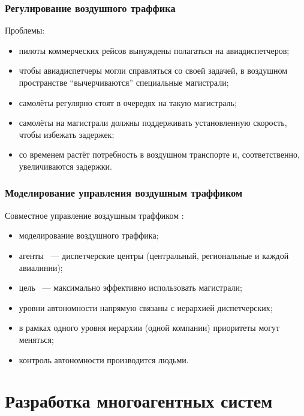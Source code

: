\documentclass{beamer}
\begin{document}
\begin{frame}
  \frametitle{Регулирование воздушного траффика}
  Проблемы:
  \begin{itemize}
    \item пилоты коммерческих рейсов вынуждены полагаться на авиадиспетчеров;
    \item чтобы авиадиспетчеры могли справляться со своей задачей, в воздушном
      пространстве ``вычерчиваются'' специальные магистрали;
    \item самолёты регулярно стоят в очередях на такую магистраль;
    \item самолёты на магистрали должны поддерживать установленную скорость,
      чтобы избежать задержек;
    \item со временем растёт потребность в воздушном транспорте и, соответственно,
      увеличиваются задержки.
  \end{itemize}
\end{frame}

\begin{frame}
  \frametitle{Моделирование управления воздушным траффиком}
  Совместное управление воздушным траффиком \cite{Wolfe2008}:
  \begin{itemize}
    \item моделирование воздушного траффика;
    \item агенты ~--- диспетчерские центры (центральный, региональные и каждой авиалинии);
    \item цель ~--- максимально эффективно использовать магистрали;
    \item уровни автономности напрямую связаны с иерархией диспетчерских;
    \item в рамках одного уровня иерархии (одной компании) приоритеты могут меняться;
    \item контроль автономности производится людьми.
  \end{itemize}
\end{frame}

\section{Разработка многоагентных систем}
\end{document}
